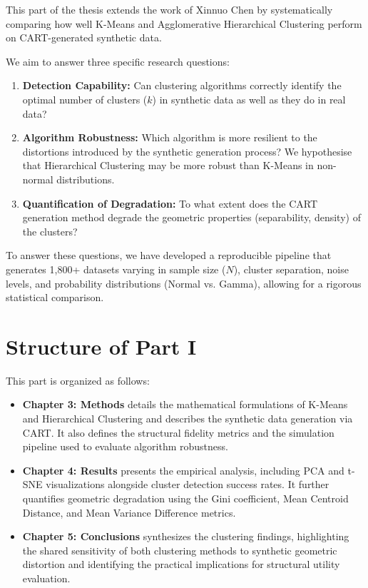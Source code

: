 This part of the thesis extends the work of Xinnuo Chen \cite{chen2025} by systematically comparing how well K-Means and Agglomerative Hierarchical Clustering perform on CART-generated synthetic data.

We aim to answer three specific research questions:
\begin{enumerate}
  \item \textbf{Detection Capability:} Can clustering algorithms correctly identify the optimal number of clusters ($k$) in synthetic data as well as they do in real data?
  \item \textbf{Algorithm Robustness:} Which algorithm is more resilient to the distortions introduced by the synthetic generation process? We hypothesise that Hierarchical Clustering may be more robust than K-Means in non-normal distributions.
  \item \textbf{Quantification of Degradation:} To what extent does the CART generation method degrade the geometric properties (separability, density) of the clusters?
\end{enumerate}

To answer these questions, we have developed a reproducible pipeline that generates 1,800+ datasets varying in sample size ($N$), cluster separation, noise levels, and probability distributions (Normal vs. Gamma), allowing for a rigorous statistical comparison.

\section{Structure of Part I}
\label{sec:clustering-structure}
This part is organized as follows:
\begin{itemize}
  \item \textbf{Chapter 3: Methods} details the mathematical formulations of K-Means and Hierarchical Clustering and describes the synthetic data generation via CART. It also defines the structural fidelity metrics and the simulation pipeline used to evaluate algorithm robustness.
  \item \textbf{Chapter 4: Results} presents the empirical analysis, including PCA and t-SNE visualizations alongside cluster detection success rates. It further quantifies geometric degradation using the Gini coefficient, Mean Centroid Distance, and Mean Variance Difference metrics.
  \item \textbf{Chapter 5: Conclusions} synthesizes the clustering findings, highlighting the shared sensitivity of both clustering methods to synthetic geometric distortion and identifying the practical implications for structural utility evaluation.
\end{itemize}
